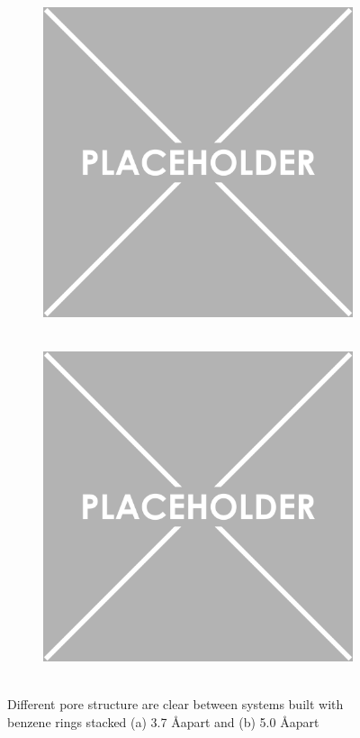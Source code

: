 \documentclass{article}
\begin{document}
	\begin{figure}
	\centering
	\begin{subfigure}{.45\textwidth}
		\centering
		\includegraphics[width=\linewidth]{placeholder.png}
		\caption{~\label{fig:phaseA}}
	\end{subfigure}
	\begin{subfigure}{.45\textwidth}
		\includegraphics[width=\linewidth]{placeholder.png}
		\centering
		\caption{~\label{fig:phaseB}}
	\end{subfigure}
	\caption{Different pore structure are clear between systems built with benzene rings stacked (a) 3.7 \AA apart and (b) 5.0 \AA apart}
	\label{fig:porestructures}
	\end{figure}
\end{document}
